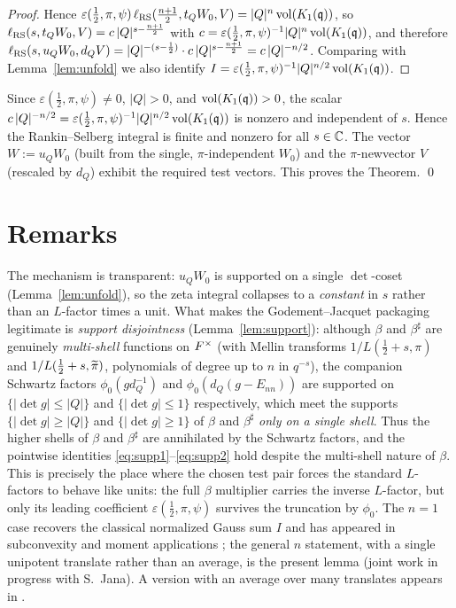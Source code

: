 \begin{proof}
Hence $\varepsilon(\tfrac12,\pi,\psi)\,\ell_{\mathrm{RS}}(\tfrac{n+1}{2},t_Q W_0,V)=|Q|^n\operatorname{vol}(K_1(\mathfrak{q}))$,
so $\ell_{\mathrm{RS}}(s,t_Q W_0,V)=c\,|Q|^{s-\frac{n+1}{2}}$ with $c=\varepsilon(\tfrac12,\pi,\psi)^{-1}
|Q|^n\operatorname{vol}(K_1(\mathfrak{q}))$, and therefore $\ell_{\mathrm{RS}}(s,u_Q W_0,d_Q V)=|Q|^{-(s-\frac12)}\cdot
c\,|Q|^{s-\frac{n+1}{2}}=c\,|Q|^{-n/2}$. Comparing with Lemma~\ref{lem:unfold} we also identify
$I=\varepsilon(\tfrac12,\pi,\psi)^{-1}|Q|^{n/2}\operatorname{vol}(K_1(\mathfrak{q}))$.
\end{proof}

Since $\varepsilon(\tfrac12,\pi,\psi)\neq0$, $|Q|>0$, and $\operatorname{vol}(K_1(\mathfrak{q}))>0$, the scalar
$c\,|Q|^{-n/2}=\varepsilon(\tfrac12,\pi,\psi)^{-1}|Q|^{n/2}\operatorname{vol}(K_1(\mathfrak{q}))$ is nonzero and
independent of $s$. Hence the Rankin--Selberg integral is finite and nonzero for all $s\in\mathbb{C}$.
The vector $W:=u_Q W_0$ (built from the single, $\pi$-independent $W_0$) and the $\pi$-newvector
$V$ (rescaled by $d_Q$) exhibit the required test vectors. This proves the Theorem. \qed

\section*{Remarks}

The mechanism is transparent: $u_Q W_0$ is supported on a single $\det$-coset
(Lemma~\ref{lem:unfold}), so the zeta integral collapses to a \emph{constant} in $s$ rather than an
$L$-factor times a unit. What makes the Godement--Jacquet packaging legitimate is
\emph{support disjointness} (Lemma~\ref{lem:support}): although $\beta$ and $\beta^\sharp$ are
genuinely \emph{multi-shell} functions on $F^\times$ (with Mellin transforms $1/L(\tfrac12+s,\pi)$
and $1/L(\tfrac12+s,\widetilde{\pi})$, polynomials of degree up to $n$ in $q^{-s}$), the companion
Schwartz factors $\phi_0(g d_Q^{-1})$ and $\phi_0(d_Q(g-E_{nn}))$ are supported on
$\{|\det g|\le|Q|\}$ and $\{|\det g|\le1\}$ respectively, which meet the supports
$\{|\det g|\ge|Q|\}$ and $\{|\det g|\ge1\}$ of $\beta$ and $\beta^\sharp$ \emph{only on a single shell}.
Thus the higher shells of $\beta$ and $\beta^\sharp$ are annihilated by the Schwartz factors, and the
pointwise identities \eqref{eq:supp1}--\eqref{eq:supp2} hold despite the multi-shell nature of $\beta$.
This is precisely the place where the chosen test pair forces the standard $L$-factors to behave like
units: the full $\beta$ multiplier carries the inverse $L$-factor, but only its leading coefficient
$\varepsilon(\tfrac12,\pi,\psi)$ survives the truncation by $\phi_0$. The $n=1$ case recovers the
classical normalized Gauss sum $I$ and has appeared in subconvexity and moment applications
\cite{Sarnak,MV}; the general $n$ statement, with a single unipotent translate rather than an
average, is the present lemma (joint work in progress with S.~Jana). A version with an average over
many translates appears in \cite{BKL}.

